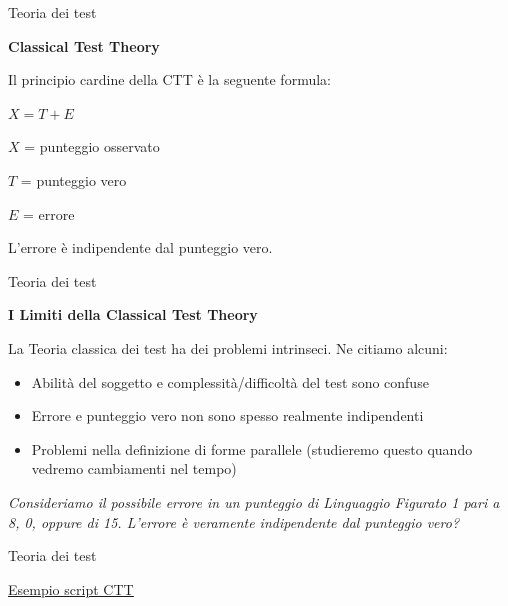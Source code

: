 \documentclass[
  ignorenonframetext,
]{beamer}
\begin{document}
\begin{frame}{Teoria dei test}
\label{teoria-dei-test-1}
\begin{center}
  \textbf{Classical Test Theory}
\end{center}

Il principio cardine della CTT è la seguente formula:

\begin{center}
$X = T + E$
\end{center}
\pause

\(X\) = punteggio osservato

\(T\) = punteggio vero

\(E\) = errore \pause \vspace{1.5em}

L'errore è indipendente dal punteggio vero.
\end{frame}

\begin{frame}{Teoria dei test}
\label{teoria-dei-test-2}
\begin{center}
  \textbf{I Limiti della Classical Test Theory}
\end{center}

La Teoria classica dei test ha dei problemi intrinseci. Ne citiamo
alcuni: \pause

\begin{itemize}[<+->]
\item
  Abilità del soggetto e complessità/difficoltà del test sono confuse
\item
  Errore e punteggio vero non sono spesso realmente indipendenti
\item
  Problemi nella definizione di forme parallele (studieremo questo
  quando vedremo cambiamenti nel tempo)
\end{itemize}

\emph{Consideriamo il possibile errore in un punteggio di Linguaggio
Figurato 1 pari a 8, 0, oppure di 15. L'errore è veramente indipendente
dal punteggio vero?}
\end{frame}

\begin{frame}{Teoria dei test}
\label{teoria-dei-test-3}
\begin{center}
  \href{https://github.com/giorgioarcara/stat_forensic_neuropsy/blob/main/code/02_True_score.R}{\underline{Esempio script CTT}}
\end{center}
\end{frame}
\end{document}
